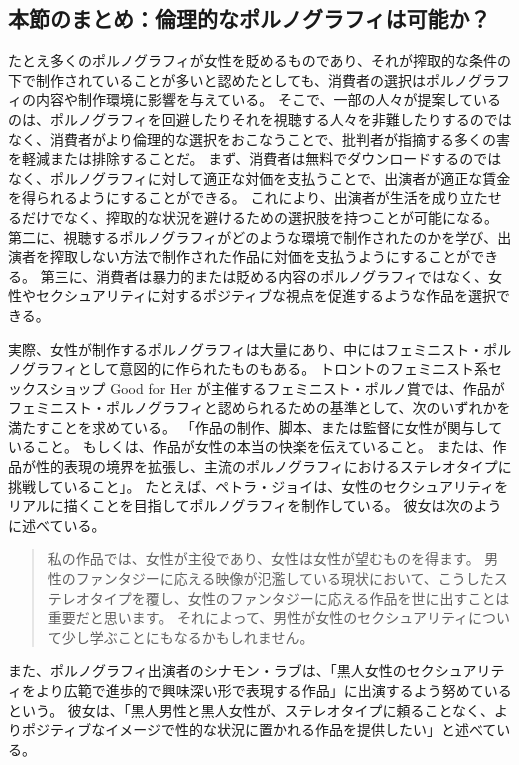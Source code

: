 \documentclass[paper=a4,book,openany]{jlreq} \usepackage{mystyle}
\begin{document}
\subsection{本節のまとめ：倫理的なポルノグラフィは可能か？}

たとえ多くのポルノグラフィが女性を貶めるものであり、それが搾取的な条件の下で制作されていることが多いと認めたとしても、消費者の選択はポルノグラフィの内容や制作環境に影響を与えている。
そこで、一部の人々が提案しているのは、ポルノグラフィを回避したりそれを視聴する人々を非難したりするのではなく、消費者がより倫理的な選択をおこなうことで、批判者が指摘する多くの害を軽減または排除することだ。
まず、消費者は無料でダウンロードするのではなく、ポルノグラフィに対して適正な対価を支払うことで、出演者が適正な賃金を得られるようにすることができる。
これにより、出演者が生活を成り立たせるだけでなく、搾取的な状況を避けるための選択肢を持つことが可能になる。
第二に、視聴するポルノグラフィがどのような環境で制作されたのかを学び、出演者を搾取しない方法で制作された作品に対価を支払うようにすることができる。
第三に、消費者は暴力的または貶める内容のポルノグラフィではなく、女性やセクシュアリティに対するポジティブな視点を促進するような作品を選択できる。

実際、女性が制作するポルノグラフィは大量にあり、中にはフェミニスト・ポルノグラフィとして意図的に作られたものもある。
トロントのフェミニスト系セックスショップ Good for Her が主催するフェミニスト・ポルノ賞では、作品がフェミニスト・ポルノグラフィと認められるための基準として、次のいずれかを満たすことを求めている。
「作品の制作、脚本、または監督に女性が関与していること。
もしくは、作品が女性の本当の快楽を伝えていること。
または、作品が性的表現の境界を拡張し、主流のポルノグラフィにおけるステレオタイプに挑戦していること」\citep{lust11:_what_is_your_defin_femin_porn}。
たとえば、ペトラ・ジョイは、女性のセクシュアリティをリアルに描くことを目指してポルノグラフィを制作している。
彼女は次のように述べている。

\begin{quote}
私の作品では、女性が主役であり、女性は女性が望むものを得ます。
男性のファンタジーに応える映像が氾濫している現状において、こうしたステレオタイプを覆し、女性のファンタジーに応える作品を世に出すことは重要だと思います。
それによって、男性が女性のセクシュアリティについて少し学ぶことにもなるかもしれません。
\citep{smith14:_porn_produc}
\end{quote}

また、ポルノグラフィ出演者のシナモン・ラブは、「黒人女性のセクシュアリティをより広範で進歩的で興味深い形で表現する作品」に出演するよう努めているという。
彼女は、「黒人男性と黒人女性が、ステレオタイプに頼ることなく、よりポジティブなイメージで性的な状況に置かれる作品を提供したい」と述べている\citep{love13:_quest_femin}。
\end{document}
